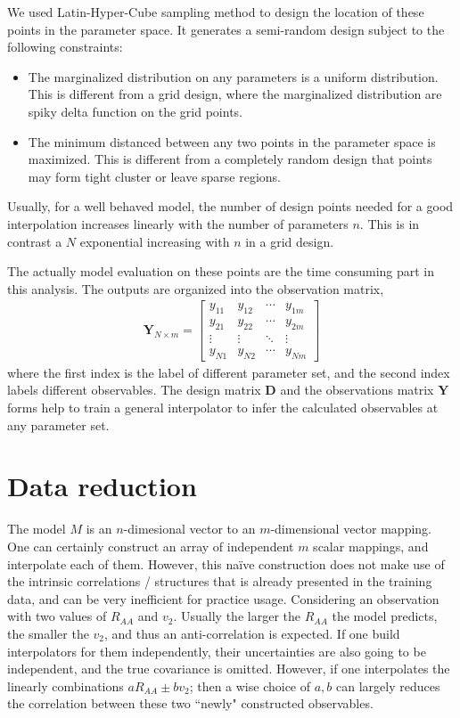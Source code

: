 We used Latin-Hyper-Cube sampling method to design the location of these points in the parameter space. 
It generates a semi-random design subject to the following constraints:
\begin{itemize}
\item The marginalized distribution on any parameters is a uniform distribution.
This is different from a grid design, where the marginalized distribution are spiky delta function on the grid points.
\item The minimum distanced between any two points in the parameter space is maximized.
This is different from a completely random design that points may form tight cluster or leave sparse regions.
\end{itemize}
Usually, for a well behaved model, the number of design points needed for a good interpolation increases linearly with the number of parameters $n$. 
This is in contrast a $N$ exponential increasing with $n$ in a grid design.

The actually model evaluation on these points are the time consuming part in this analysis.
The outputs are organized into the observation matrix,
\begin{eqnarray}
\mathbf{Y}_{N\times m} = 
\begin{bmatrix}
y_{11} & y_{12} & \cdots & y_{1m}\\
y_{21} & y_{22} & \cdots & y_{2m}\\
\vdots & \vdots & \ddots & \vdots \\
y_{N1} & y_{N2} & \cdots & y_{Nm}
\end{bmatrix}
\end{eqnarray}
where the first index is the label of different parameter set, and the second index labels different observables.
The design matrix $\mathbf{D}$ and the observations matrix $\mathbf{Y}$ forms help to train a general interpolator to infer the calculated observables at any parameter set.

\section{Data reduction}
The model $M$ is an $n$-dimesional vector to an $m$-dimensional vector mapping. 
One can certainly construct an array of independent $m$ scalar mappings, and interpolate each of them.
However, this na\"ive construction does not make use of the intrinsic correlations / structures that is already presented in the training data, and can be very inefficient for practice usage.
Considering an observation with two values of $R_{AA}$ and $v_2$. Usually the larger the $R_{AA}$ the model predicts, the smaller the $v_2$, and thus an anti-correlation is expected.
If one build interpolators for them independently, their uncertainties are also going to be independent, and the true covariance is omitted.
However, if one interpolates the linearly combinations $a R_{AA} \pm b v_2$; then a wise choice of $a, b$ can largely reduces the correlation between these two ``newly" constructed observables.

